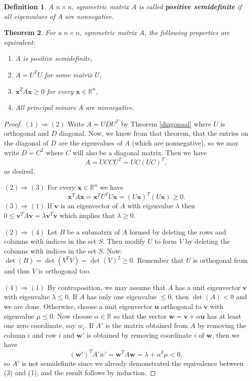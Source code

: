 \documentclass[a4paper,11pt]{report}
\newtheorem{theorem}{Theorem}[section]
\newtheorem{definition}[theorem]{Definition}
\newcommand{\R}{{\mathbb R}}
\begin{document}
\begin{definition}
  A $n\times n$, symmetric matrix $A$ is called \textbf{positive semidefinite} if
all eigenvalues of $A$ are nonnegative.
\end{definition}
\begin{theorem}
  For a $n \times n$, symmetric matrix $A$, the following properties are equivalent:
  \begin{enumerate}
    \item $A$ is positive semidefinite,
    \item $A = U^T U$ for some matrix $U$,
    \item $\mathbf{x}^T A \mathbf{x} \geq 0$ for every $\mathbf{x} \in \R^n$,
    \item All principal minors $A$ are nonnegative.
  \end{enumerate}
\end{theorem}
\begin{proof}
  $(1)\Rightarrow (2)$ Write $A = UDU^T$ by Theorem \ref{diagonaal} where $U$ is 
  orthogonal and $D$ diagonal. Now, we know from that theorem, that the entries 
  on the diagonal of $D$ are the eigenvalues of $A$ (which are nonnegative), so 
  we may write $D = C^2$ where $C$ will also be a diagonal matrix. Then we have 
  $$A = UCCU^T = UC(UC)^T,$$
  as desired.
  
 $(2)\Rightarrow (3)$ For every $\mathbf{x} \in \R^n$ we have 
  $$\mathbf{x}^T A \mathbf{x} = \mathbf{x}^T U^T U \mathbf{x} = (U\mathbf{x})^T(U\mathbf{x}) 
  \geq 0.$$
 $(3)\Rightarrow (1)$ If $\mathbf{v}$ is an eigenvector of $A$ with eigenvalue $\lambda$ 
  then $0 \leq \mathbf{v}^T A \mathbf{v} = \lambda \mathbf{v}^T \mathbf{v}$ 
  which implies that $\lambda \geq 0$.
  
  $(2) \Rightarrow (4)$ Let $B$ be a submatrix of $A$ formed by deleting the rows 
  and columns with indices in the set $S$. Then modify $U$ to form $V$ by 
  deleting the columns with indices in the set $S$. Now: $\det(B) = \det(V^TV) = \det(V)^2 \geq 
  0$. Remember that $U$ is orthogonal from and thus $V$ is orthogonal too.
  
  $(4) \Rightarrow (1)$ By contraposition, we may assume that $A$ has a unit 
  eigenvector $\mathbf{v}$ with eigenvalue $\lambda \leq 0$. If $A$ has only one 
  eigenvalue $\leq 0$, then $\det(A) < 0$ and we are done. Otherwise, choose a 
  unit eigenvector $\mathbf{u}$ orthogonal to $\mathbf{v}$ with eigenvalue $\mu \leq 
  0$. Now choose $\alpha \in \R$ so that the vector $\mathbf{w} = \mathbf{v} + \alpha \mathbf{u}$ 
  has at least one zero coordinate, say $w_i$. If $A'$ is the matrix obtained 
  from $A$ by removing the column $i$ and row $i$ and $\mathbf{w'}$ is obtained 
  by removing coordinate $i$ of $\mathbf{w}$, then we have 
  $$(\mathbf{w'})^T A' w' = \mathbf{w}^T A \mathbf{w} = \lambda + \alpha^2 \mu < 
  0, $$
  so $A'$ is not semidefinite since we already demonstrated the equivalence 
  between (3) and (1), and the result follows by induction.
 \end{proof}
\end{document}

